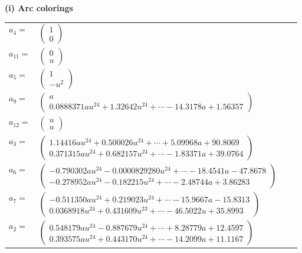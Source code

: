 \documentclass[1p]{elsarticle_modified}
\theoremstyle{definition}
\begin{document}
\flushleft \textbf{(i) Arc colorings}\\
\begin{tabular}{m{7pt} m{180pt} m{7pt} m{180pt} }
\flushright $a_{4}=$&$\begin{pmatrix}1\\0\end{pmatrix}$ \\
\flushright $a_{11}=$&$\begin{pmatrix}0\\u\end{pmatrix}$ \\
\flushright $a_{5}=$&$\begin{pmatrix}1\\- u^2\end{pmatrix}$ \\
\flushright $a_{9}=$&$\begin{pmatrix}a\\0.0888371 a u^{24}+1.32642 u^{24}+\cdots-14.3178 a+1.56357\end{pmatrix}$ \\
\flushright $a_{12}=$&$\begin{pmatrix}u\\u\end{pmatrix}$ \\
\flushright $a_{3}=$&$\begin{pmatrix}1.14416 a u^{24}+0.500026 u^{24}+\cdots+5.09968 a+90.8069\\0.371315 a u^{24}+0.682157 u^{24}+\cdots-1.83371 a+39.0764\end{pmatrix}$ \\
\flushright $a_{6}=$&$\begin{pmatrix}-0.790302 a u^{24}-0.0000829280 u^{24}+\cdots-18.4541 a-47.8678\\-0.278952 a u^{24}-0.182215 u^{24}+\cdots-2.48744 a+3.86283\end{pmatrix}$ \\
\flushright $a_{7}=$&$\begin{pmatrix}-0.511350 a u^{24}+0.219023 u^{24}+\cdots-15.9667 a-15.8313\\0.0368918 u^{24}+0.431609 u^{23}+\cdots-46.5022 u+35.8993\end{pmatrix}$ \\
\flushright $a_{2}=$&$\begin{pmatrix}0.548179 a u^{24}-0.887679 u^{24}+\cdots+8.28779 a+12.4597\\0.393575 a u^{24}+0.443170 u^{24}+\cdots-14.2099 a+11.1167\end{pmatrix}$ \\

\end{tabular}
\end{document}
